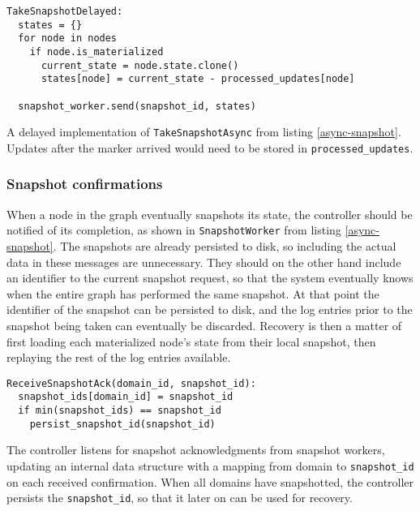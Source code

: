 \documentclass[b5paper]{report}
\begin{document}
\begin{listing}[H]
  \begin{verbatim}
TakeSnapshotDelayed:
  states = {}
  for node in nodes
    if node.is_materialized
      current_state = node.state.clone()
      states[node] = current_state - processed_updates[node]

  snapshot_worker.send(snapshot_id, states)
  \end{verbatim}
  \caption{
    A delayed implementation of \texttt{TakeSnapshotAsync} from listing
    \ref{async-snapshot}. Updates after the marker arrived would need to be stored
    in \texttt{processed\_updates}.
  }
\end{listing}

\subsubsection{Snapshot confirmations}
When a node in the graph eventually snapshots its state, the controller should
be notified of its completion, as shown in \texttt{SnapshotWorker} from listing
\ref{async-snapshot}. The snapshots are already persisted to disk, so including
the actual data in these messages are unnecessary. They should on the other
hand include an identifier to the current snapshot request, so that the system
eventually knows when the entire graph has performed the same snapshot. At that
point the identifier of the snapshot can be persisted to disk, and the log
entries prior to the snapshot being taken can eventually be discarded.
Recovery is then a matter of first loading each materialized node's state from
their local snapshot, then replaying the rest of the log entries available.

\begin{listing}[H]
  \begin{verbatim}
ReceiveSnapshotAck(domain_id, snapshot_id):
  snapshot_ids[domain_id] = snapshot_id
  if min(snapshot_ids) == snapshot_id
    persist_snapshot_id(snapshot_id)
  \end{verbatim}
  \caption{
    The controller listens for snapshot acknowledgments from snapshot
    workers, updating an internal data structure with a mapping from domain to
    \texttt{snapshot\_id} on each received confirmation. When all domains have
    snapshotted, the controller persists the \texttt{snapshot\_id}, so that it
    later on can be used for recovery.
    \label{snapshot_acks}
  }
\end{listing}
\end{document}
